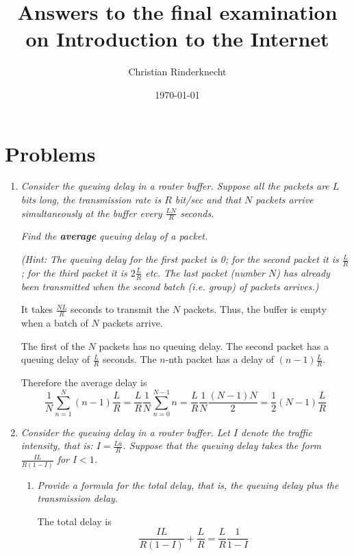 \documentclass[12pt,a4paper]{article}
\title{Answers to the final examination on Introduction to the Internet}
\author{Christian Rinderknecht}
\date{\today}
\begin{document}
\maketitle

\section{Problems}

\begin{enumerate}

  \item \emph{Consider the queuing delay in a router buffer. Suppose
    all the packets are \(L\) bits long, the transmission rate is
    \(R\) bit/sec and that \(N\) packets arrive simultaneously at the
    buffer every \(\frac{LN}{R}\) seconds.}

    \emph{Find the \textbf{average} queuing delay of a packet.}

    \emph{(\emph{Hint}: The queuing delay for the first packet is 0;
      for the second packet it is \(\frac{L}{R}\); for the third
      packet it is \(2{\frac{L}{R}}\) etc. The last packet (number
      \(N\)) has already been transmitted when the second batch
      (i.e. group) of packets arrives.)}

    It takes \(\frac{NL}{R}\) seconds to transmit the \(N\)
    packets. Thus, the buffer is empty when a batch of \(N\) packets
    arrive.

    The first of the \(N\) packets has no queuing delay. The second
    packet has a queuing delay of \(\frac{L}{R}\) seconds. The
    \(n\)-nth packet has a delay of \((n-1){\frac{L}{R}}\).

   Therefore the average delay is
   \setlength\mathindent{-1pc}
   \[
     {\frac{1}{N}}\sum_{n=1}^{N}(n-1){\frac{L}{R}} = \frac{L}{R}
     \frac{1}{N} \sum_{n=0}^{N-1}n = \frac{L}{R} \frac{1}{N}
     \frac{(N-1)N}{2} = \frac{1}{2} (N-1) \frac{L}{R}
   \]

  \item \emph{Consider the queuing delay in a router buffer. Let \(I\)
    denote the traffic intensity, that is: \(I =
    \frac{La}{R}\). Suppose that the queuing delay takes the form
    \(\frac{IL}{R(1-I)}\) for \(I < 1\).}
    \begin{enumerate}

      \item \emph{Provide a formula for the total delay, that is, the
        queuing delay plus the transmission delay.}

      The total delay is
      \[
        \frac{IL}{R(1-I)} + \frac{L}{R} = \frac{L}{R} \frac{1}{1-I}
      \]


\end{enumerate}
\end{enumerate}
\end{document}
